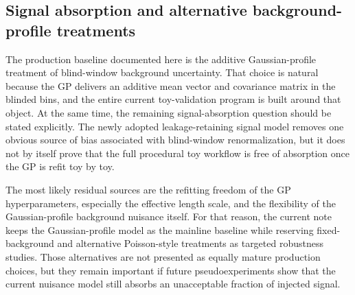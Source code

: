 \subsection{Signal absorption and alternative background-profile treatments}

The production baseline documented here is the additive Gaussian-profile treatment of
blind-window background uncertainty. That choice is natural because the GP delivers an
additive mean vector and covariance matrix in the blinded bins, and the entire current
toy-validation program is built around that object. At the same time, the remaining
signal-absorption question should be stated explicitly. The newly adopted
leakage-retaining signal model removes one obvious source of bias associated with
blind-window renormalization, but it does not by itself prove that the full procedural
toy workflow is free of absorption once the GP is refit toy by toy.

The most likely residual sources are the refitting freedom of the GP hyperparameters,
especially the effective length scale, and the flexibility of the Gaussian-profile
background nuisance itself. For that reason, the current note keeps the
Gaussian-profile model as the mainline baseline while reserving fixed-background and
alternative Poisson-style treatments as targeted robustness studies. Those alternatives
are not presented as equally mature production choices, but they remain important if
future pseudoexperiments show that the current nuisance model still absorbs an
unacceptable fraction of injected signal.
